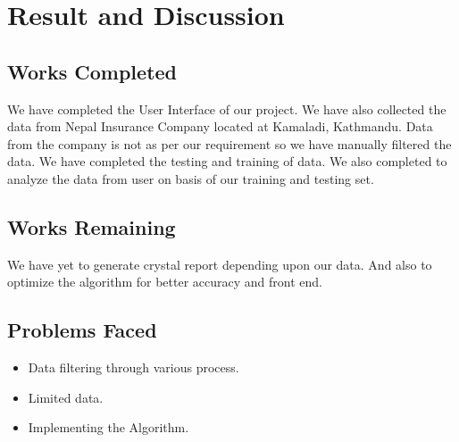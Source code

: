 \chapter{Result and Discussion}
\section{Works Completed}
We have completed the User Interface of our project. We have also collected the data from Nepal Insurance Company located at Kamaladi, Kathmandu.\cite{data2017} Data from the company is not as per our requirement so we have manually filtered the data.  We have completed the testing and training of data. We also completed to analyze the data from user on basis of our training and testing set.

\section{Works Remaining}
We have yet to generate crystal report depending upon our data. And also to optimize the algorithm for better accuracy and front end. 
 
\section{Problems Faced}
\begin{itemize}
\item Data filtering through various process. 
\item Limited data.
\item Implementing the Algorithm.
\end{itemize}
\newpage
